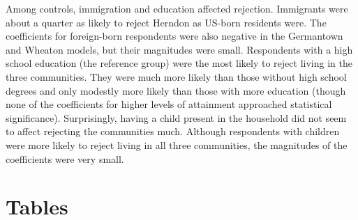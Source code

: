 \documentclass{baderart}
\begin{document}

Among controls, immigration and education affected rejection. Immigrants were about a quarter as likely to reject Herndon as US-born residents were. The coefficients for foreign-born respondents were also negative in the Germantown and Wheaton models, but their magnitudes were small. Respondents with a high school education (the reference group) were the most likely to reject living in the three communities. They were much more likely than those without high school degrees and only modestly more likely than those with more education (though none of the coefficients for higher levels of attainment approached statistical significance). Surprisingly, having a child present in the household did not seem to affect rejecting the communities much. Although respondents with children were more likely to reject living in all three communities, the magnitudes of the coefficients were very small.  

\clearpage


\section{Tables}


















\end{document}
